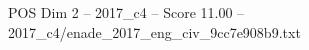 \begin{textsample}{POS Dim 2 – 2017\_c4 – Score 11.00 – 2017\_c4/enade\_2017\_eng\_civ\_9cc7e908b9.txt}
\end{textsample}
